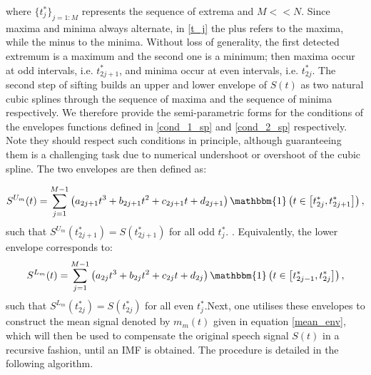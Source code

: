 where $ \{ t_j^{*} \}_{j = 1: M}$ represents the sequence of extrema and $M << N$. Since maxima and minima always alternate, in \ref{t_j} the plus refers to the maxima, while the minus to the minima. Without loss of generality, the first detected extremum is a maximum and the second one is a minimum; then maxima occur at odd intervals, i.e. $t^*_{2j+1}$, and minima occur at even intervals, i.e. $t^*_{2j}$. The second step of sifting builds an upper and lower envelope of $S(t)$ as two natural cubic splines through the sequence of maxima and the sequence of minima respectively. We therefore provide the semi-parametric forms for the conditions of the envelopes functions defined in \ref{cond_1_sp} and \ref{cond_2_sp} respectively. Note they should respect such conditions in principle, although guaranteeing them is a challenging task due to numerical undershoot or overshoot of the cubic spline. The two envelopes are then defined as:

\begin{equation}
\label{upper_env}
S^{U_m}(t) = \sum_{j=1}^{M-1} \left( a_{2j+1}  t^3 + b_{2j+1} t^2 + c_{2j+1} t  +d_{2j+1} \right) \mathbbm{1} \left( t \in \left[ t^*_{2j}, t^*_{2j+1} \right] \right),
\end{equation}
such that $S^{U_m} (t^*_{2j+1}) = S(t^*_{2j+1})$ for all odd $ t^*_{j}$. . Equivalently, the lower envelope corresponds to: 
\begin{equation}
\label{lower_env}
S^{L_m}(t) = \sum_{j=1}^{M-1} \left( a_{2j}  t^3 + b_{2j} t^2 + c_{2j} t  +d_{2j} \right)   \mathbbm{1} \left( t \in \left[ t^*_{2j-1}, t^*_{2j} \right] \right),
\end{equation}
such that $S^{L_m} (t^*_{2j}) = S(t^*_{2j})$ for all even $ t_j^*$.Next, one utilises these envelopes to construct the mean signal denoted by $m_m(t)$ given in equation \ref{mean_env}, which will then be used to compensate the original speech signal $S(t)$ in a recursive fashion, until an IMF is obtained.  The procedure is detailed in the following algorithm.

